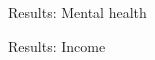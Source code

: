\documentclass[notes,11pt, aspectratio=169]{beamer}
\begin{document}
\begin{frame}{Results: Mental health}

	\begin{figure}
	\end{figure}

\end{frame}

\begin{frame}{Results: Income}

	\begin{figure}
	\end{figure}

\end{frame}
\end{document}
